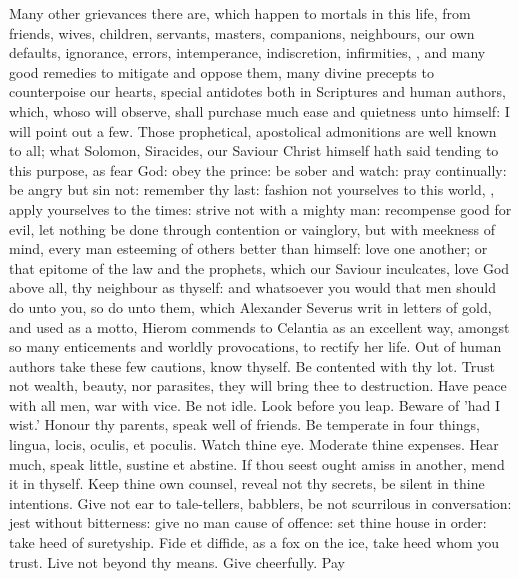 {Many other grievances there are, which happen to mortals in this life,
from friends, wives, children, servants, masters, companions,
neighbours, our own defaults, ignorance, errors, intemperance,
indiscretion, infirmities, \etc{}, and many good remedies to mitigate and
oppose them, many divine precepts to counterpoise our hearts, special
antidotes both in Scriptures and human authors, which, whoso will
observe, shall purchase much ease and quietness unto himself: I will
point out a few. Those prophetical, apostolical admonitions are well
known to all; what Solomon, Siracides, our Saviour Christ himself hath
said tending to this purpose, as fear God: obey the prince: be sober
and watch: pray continually: be angry but sin not: remember thy last:
fashion not yourselves to this world, \etc{}, apply yourselves to the
times: strive not with a mighty man: recompense good for evil, let
nothing be done through contention or vainglory, but with meekness of
mind, every man esteeming of others better than himself: love one
another; or that epitome of the law and the prophets, which our Saviour
inculcates, love God above all, thy neighbour as thyself: and
whatsoever you would that men should do unto you, so do unto them,
which Alexander Severus writ in letters of gold, and used as a motto,
 Hierom commends to Celantia as an excellent way, amongst so many
enticements and worldly provocations, to rectify her life. Out of human
authors take these few cautions, know thyself. Be contented
with thy lot. Trust not wealth, beauty, nor parasites, they will
bring thee to destruction. Have peace with all men, war with
vice. Be not idle. Look before you leap. Beware of
'had I wist.' Honour thy parents, speak well of friends. Be
temperate in four things, lingua, locis, oculis, et poculis. Watch
thine eye. Moderate thine expenses. Hear much, speak little,
sustine et abstine. If thou seest ought amiss in another, mend it
in thyself. Keep thine own counsel, reveal not thy secrets, be silent
in thine intentions. Give not ear to tale-tellers, babblers, be
not scurrilous in conversation: jest without bitterness: give no
man cause of offence: set thine house in order: take heed of
suretyship. Fide et diffide, as a fox on the ice, take heed whom
you trust. Live not beyond thy means. Give cheerfully. Pay
}
